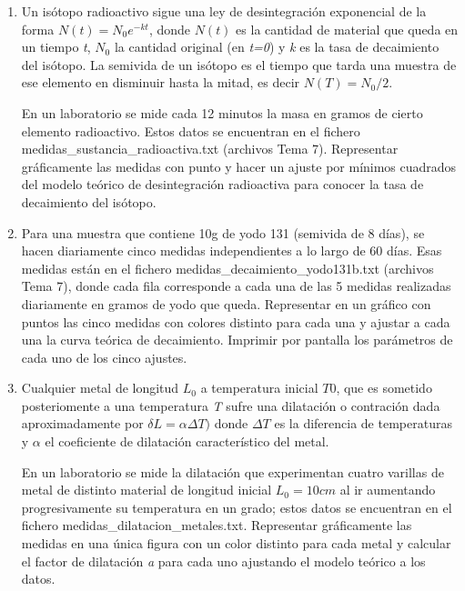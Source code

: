 \documentclass[letterpaper,10pt,spanish]{sphinxmanual}
\begin{document}
\begin{enumerate}
\item {} 
Un isótopo radioactivo sigue una ley de desintegración exponencial de la forma $N(t) = N_0e^{-kt}$, donde $N(t)$ es la cantidad de material que queda en un tiempo \emph{t}, $N_0$ la cantidad original (en \emph{t=0}) y \emph{k} es la tasa de decaimiento del isótopo. La semivida de un isótopo es el tiempo que tarda una muestra de ese elemento en disminuir hasta la mitad, es decir $N(T)=N_0/2$.

En un laboratorio se mide cada 12 minutos la masa en gramos de cierto elemento radioactivo. Estos datos se encuentran en el fichero medidas\_sustancia\_radioactiva.txt (archivos Tema 7). Representar gráficamente las medidas con punto y hacer un ajuste por mínimos cuadrados del modelo teórico de desintegración radioactiva para conocer la tasa de decaimiento del isótopo.

\item {} 
Para una muestra que contiene 10g de yodo 131 (semivida de 8 días), se hacen diariamente cinco medidas independientes a lo largo de 60 días. Esas medidas están en el fichero medidas\_decaimiento\_yodo131b.txt (archivos Tema 7), donde cada fila corresponde a cada una de las 5 medidas realizadas diariamente en gramos de yodo que queda. Representar en un gráfico con puntos las cinco medidas con colores distinto para cada una y ajustar a cada una la curva teórica de decaimiento. Imprimir por pantalla los parámetros de cada uno de los cinco ajustes.

\item {} 
Cualquier metal de longitud $L_0$ a temperatura inicial $T0$, que es sometido posteriomente a una temperatura \emph{T} sufre una dilatación o contración dada aproximadamente por $\delta L = \alpha \Delta T)$ donde $\Delta T$ es la diferencia de temperaturas y $\alpha$ el coeficiente de dilatación característico del metal.

En un laboratorio se mide la dilatación que experimentan cuatro varillas de metal de distinto material de longitud inicial $L_0=10cm$ al ir aumentando progresivamente su temperatura en un grado; estos datos se encuentran en el fichero medidas\_dilatacion\_metales.txt. Representar gráficamente las medidas en una única figura con un color distinto para cada metal y calcular el factor de dilatación \emph{a} para cada uno ajustando el modelo teórico a los datos.

\end{enumerate}
\end{document}
